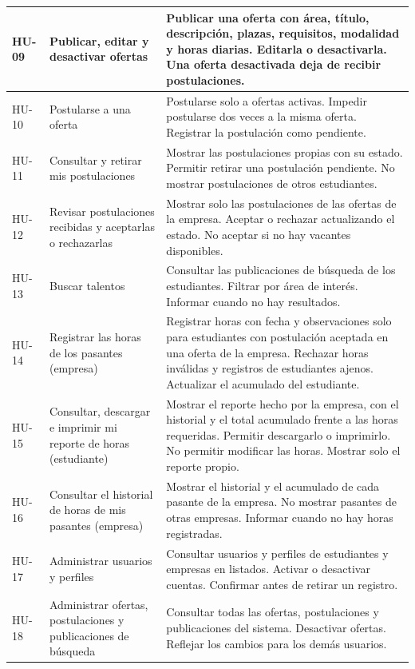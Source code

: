 \begin{longtable}{@{}>{\raggedright\arraybackslash}p{2.2cm}>{\raggedright\arraybackslash}p{4.5cm}>{\raggedright\arraybackslash}p{9.3cm}@{}}
	\hline
	HU-09 & Publicar, editar y desactivar ofertas & Publicar una oferta con área, título, descripción, plazas, requisitos, modalidad y horas diarias. Editarla o desactivarla. Una oferta desactivada deja de recibir postulaciones. \\
	\hline
	HU-10 & Postularse a una oferta & Postularse solo a ofertas activas. Impedir postularse dos veces a la misma oferta. Registrar la postulación como pendiente. \\
	\hline
	HU-11 & Consultar y retirar mis postulaciones & Mostrar las postulaciones propias con su estado. Permitir retirar una postulación pendiente. No mostrar postulaciones de otros estudiantes. \\
	\hline
	HU-12 & Revisar postulaciones recibidas y aceptarlas o rechazarlas & Mostrar solo las postulaciones de las ofertas de la empresa. Aceptar o rechazar actualizando el estado. No aceptar si no hay vacantes disponibles. \\
	\hline
	HU-13 & Buscar talentos & Consultar las publicaciones de búsqueda de los estudiantes. Filtrar por área de interés. Informar cuando no hay resultados. \\
	\hline
	HU-14 & Registrar las horas de los pasantes (empresa) & Registrar horas con fecha y observaciones solo para estudiantes con postulación aceptada en una oferta de la empresa. Rechazar horas inválidas y registros de estudiantes ajenos. Actualizar el acumulado del estudiante. \\
	\hline
	HU-15 & Consultar, descargar e imprimir mi reporte de horas (estudiante) & Mostrar el reporte hecho por la empresa, con el historial y el total acumulado frente a las horas requeridas. Permitir descargarlo o imprimirlo. No permitir modificar las horas. Mostrar solo el reporte propio. \\
	\hline
	HU-16 & Consultar el historial de horas de mis pasantes (empresa) & Mostrar el historial y el acumulado de cada pasante de la empresa. No mostrar pasantes de otras empresas. Informar cuando no hay horas registradas. \\
	\hline
	HU-17 & Administrar usuarios y perfiles & Consultar usuarios y perfiles de estudiantes y empresas en listados. Activar o desactivar cuentas. Confirmar antes de retirar un registro. \\
	\hline
	HU-18 & Administrar ofertas, postulaciones y publicaciones de búsqueda & Consultar todas las ofertas, postulaciones y publicaciones del sistema. Desactivar ofertas. Reflejar los cambios para los demás usuarios. \\

\end{longtable}
